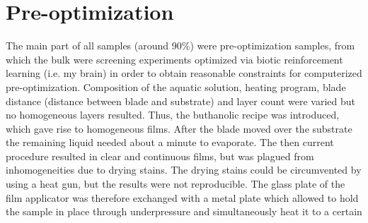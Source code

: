 \section{Pre-optimization}\label{sec:exp-preopt}
The main part of all samples (around 90\%) were pre-optimization samples, 
from which the bulk were screening experiments optimized via biotic reinforcement learning 
(i.e. my brain) in order to obtain reasonable constraints for computerized pre-optimization. 
Composition of the aquatic solution, heating program, blade distance (distance between 
blade and substrate) and layer count were varied but no homogeneous layers resulted. 
Thus, 
the buthanolic recipe was introduced, which gave rise to homogeneous films.
After the blade moved over the substrate the remaining liquid needed about a minute 
to evaporate. 
The then current procedure resulted in clear and continuous films, but was plagued from 
inhomogeneities due to drying stains. 
The drying stains could be circumvented by using a heat gun, but the results were not 
reproducible. 
The glass plate of the film applicator was therefore exchanged with a metal plate which 
allowed to hold the sample in place through underpressure and simultaneously heat it to a certain 
